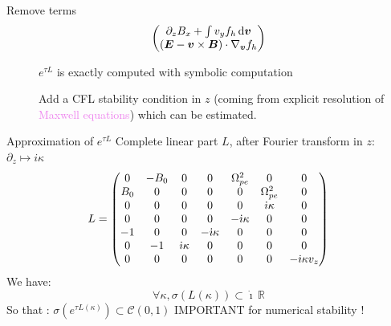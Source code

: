 \documentclass{beamer}
\newcommand{\cmark}{{\color{dgreen}\ding{52}}}
\newcommand{\xmark}{{\color{mred}\ding{55}}}
\newcommand{\Mvb}[1]{\boldsymbol{#1}}
\newcommand{\I}{\dot{\imath}}
\begin{document}
\begin{frame}{Remove terms}
$$\begin{pmatrix}
      \textcolor{violet}{ \partial_zB_x} + \int v_yf_h\dd{\Mvb{v}} \\
      (\Mvb{E}-\Mvb{v}\times\Mvb{B})\cdot\nabla_{\Mvb{v}}f_h
    \end{pmatrix}
  $$
  \begin{description}
    \item[\cmark] $e^{\tau L}$ is exactly computed with symbolic computation
    \item[\xmark] Add a CFL stability condition in $z$ (coming from explicit resolution of \textcolor{violet}{Maxwell equations}) which can be estimated.
  \end{description}
\end{frame}


\begin{frame}{Approximation of $e^{\tau L}$}
  Complete linear part $L$, after Fourier transform in $z$: $\partial_z\mapsto i\kappa$
  $$
    L = \begin{pmatrix}
      \gz & -B_0 & \gz                      &  \gz                      &  \Omega_{pe}^2            & \gz                      & \gz \\ 
      B_0 &  \gz & \gz                      &  \gz                      &  \gz                      & \Omega_{pe}^2            & \gz \\
      \gz &  \gz & \gz                      &  \gz                      &  \gz                      & \color{violet}{\I\kappa} & \gz \\ 
      \gz &  \gz & \gz                      &  \gz                      & \color{violet}{-\I\kappa} & \gz                      & \gz \\ 
      -1  &  \gz & \gz                      & \color{violet}{-\I\kappa} &  \gz                      & \gz                      & \gz \\ 
      \gz & -1   & \color{violet}{\I\kappa} &  \gz                      &  \gz                      & \gz                      & \gz \\ 
      \gz &  \gz & \gz                      &  \gz                      &  \gz                      & \gz                      & -\I\kappa v_z \\ 
    \end{pmatrix}
  $$
  We have:
  $$
    \forall \kappa, \sigma({L(\kappa)})\subset \I\,\mathbb{R}
  $$
  So that : $\sigma(e^{\tau L(\kappa)})\subset \mathcal{C}(0,1)$ \textcolor{mred}{IMPORTANT for numerical stability !}
\end{frame}
\end{document}
